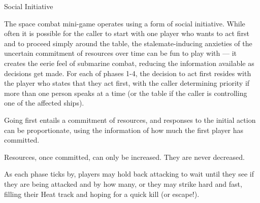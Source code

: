 \vfil\begin{sidebox}{Social Initiative}

\label{sec:Social Initiative}

The space combat mini-game operates using a form of social initiative. While often it is possible for the caller to start with one player who wants to act first and to proceed simply around the table, the stalemate-inducing anxieties of the uncertain commitment of resources over time can be fun to play with --- it creates the eerie feel of submarine combat, reducing the information available as decisions get made. For each of phases 1-4, the decision to act first resides with the player who states that they act first, with the caller determining priority if more than one person speaks at a time (or the table if the caller is controlling one of the affected ships).

Going first entails a commitment of resources, and responses to the initial action can be proportionate, using the information of how much the first player has committed.

Resources, once committed, can only be increased.
They are never decreased.

As each phase ticks by, players may hold back attacking to wait until they see if they are being attacked and by how many, or they may strike hard and fast, filling their Heat track and hoping for a quick kill (or escape!).
\end{sidebox}
